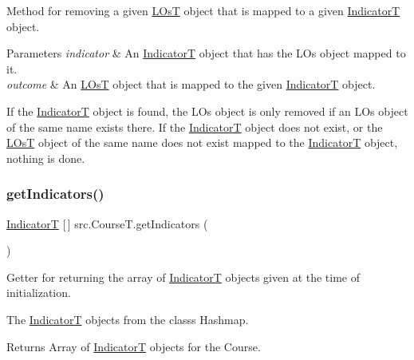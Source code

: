 Method for removing a given \hyperlink{classsrc_1_1LOsT}{L\+OsT} object that is mapped to a given \hyperlink{enumsrc_1_1IndicatorT}{IndicatorT} object. 


\begin{DoxyParams}{Parameters}
{\em indicator} & An \hyperlink{enumsrc_1_1IndicatorT}{IndicatorT} object that has the L\+Os object mapped to it. \\
\hline
{\em outcome} & An \hyperlink{classsrc_1_1LOsT}{L\+OsT} object that is mapped to the given \hyperlink{enumsrc_1_1IndicatorT}{IndicatorT} object.\\
\hline
\end{DoxyParams}
If the \hyperlink{enumsrc_1_1IndicatorT}{IndicatorT} object is found, the L\+Os object is only removed if an L\+Os object of the same name exists there. If the \hyperlink{enumsrc_1_1IndicatorT}{IndicatorT} object does not exist, or the \hyperlink{classsrc_1_1LOsT}{L\+OsT} object of the same name does not exist mapped to the \hyperlink{enumsrc_1_1IndicatorT}{IndicatorT} object, nothing is done. \mbox{\label{classsrc_1_1CourseT_a303c3055b3a9ae2e80d0b7cfed58824f}} 
\subsubsection{\texorpdfstring{get\+Indicators()}{getIndicators()}}
{\footnotesize\ttfamily \hyperlink{enumsrc_1_1IndicatorT}{IndicatorT} \mbox{[}$\,$\mbox{]} src.\+Course\+T.\+get\+Indicators (\begin{DoxyParamCaption}{ }\end{DoxyParamCaption})}



Getter for returning the array of \hyperlink{enumsrc_1_1IndicatorT}{IndicatorT} objects given at the time of initialization. 

The \hyperlink{enumsrc_1_1IndicatorT}{IndicatorT} objects from the class\textquotesingle{}s Hashmap. \begin{DoxyReturn}{Returns}
Array of \hyperlink{enumsrc_1_1IndicatorT}{IndicatorT} objects for the Course. 
\end{DoxyReturn}
\mbox{\label{classsrc_1_1CourseT_aeec398eb1776b7b635a0f377b638992e}} 
